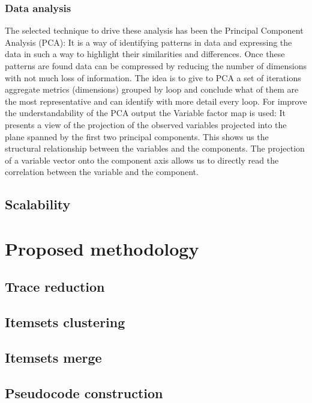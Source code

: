 \subsubsection{Data analysis}

The selected technique to drive these
analysis has been the Principal Component Analysis (PCA): It is a way of
identifying patterns in data and expressing the data in such a way to highlight
their similarities and differences. Once these patterns are found data can be
compressed by reducing the number of dimensions with not much loss of
information. The idea is to give to PCA a set of iterations aggregate metrics
 (dimensions) grouped by loop and conclude what of them are 
the most representative and can identify with more detail every loop. For improve
the understandability of the PCA output the Variable factor map is used: It
presents a view of the projection of the observed variables projected into the
plane spanned by the first two principal components. This shows us the
structural relationship between the variables and the components. The projection
of a variable vector onto the component axis allows us to directly read the
correlation between the variable and the component.



\subsection{Scalability}\label{ss:scalability}

\section{Proposed methodology}

\subsection{Trace reduction}

\subsection{Itemsets clustering}

\subsection{Itemsets merge}

\subsection{Pseudocode construction}
